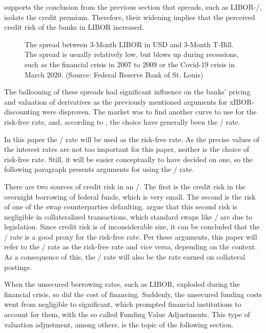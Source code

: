 \documentclass[main.tex]{subfiles}
\begin{document}
     supports the conclusion from the previous section
    that spreads, such as LIBOR-\OIS/, isolate the credit premium.
    Therefore, their widening implies that the perceived credit risk of the banks in LIBOR increased.

    \begin{figure}
        \centering
        \resizebox{\textwidth}{!}{%
            
        }
        \caption{
            The spread between 3-Month LIBOR in USD and 3-Month T-Bill.
            The spread is usually relatively low, 
            but blows up during recessions, 
            such as the financial crisis in 2007 to 2009 or
            the Covid-19 crisis in March 2020.
            (Source: Federal Reserve Bank of St. Louis)
        }
        \label{fig:ted-spread}
    \end{figure}

    The ballooning of these spreads
    had significant influence on the banks' pricing and valuation of derivatives
    as the previously mentioned arguments for xIBOR-discounting were disproven.
    The market was to find another curve to use for the risk-free rate,
    and, according to \textcite{Green2015XVA}, the choice have generally been the \OIS/ rate.

    In this paper the \OIS/ rate will be used as the risk-free rate.
    As the precise values of the interest rates are not too important for this paper,
    neither is the choice of risk-free rate.
    Still, it will be easier conceptually to have decided on one,
    so the following paragraph presents arguments for using the \OIS/ rate.

    There are two sources of credit risk in an \OIS/.
    The first is the credit risk in the overnight borrowing of federal funds, which is very small. 
    The second is the risk of one of the swap counterparties defaulting.
    \textcite{HullWhiteOISvsLIBOR}
    argue that this second risk is negligible in collateralized transactions,
    which standard swaps like \OIS/ are due to legislation.
    Since credit risk is of inconsiderable size, it can be concluded 
    that the \OIS/ rate is a good proxy for the risk-free rate.
    Per these arguments, this paper will refer to the \OIS/ rate as the risk-free rate
    and vice versa, depending on the context.
    As a consequence of this, the \OIS/ rate will also be the rate earned on collateral postings.

    When the unsecured borrowing rates, such as LIBOR, exploded during the financial crisis, 
    so did the cost of financing. 
    Suddenly, the unsecured funding costs went from negligible to significant,
    which prompted financial institutions to account for them, 
    with the so called Funding Value Adjustments. 
    This type of valuation adjustment, among others, is the topic of the following section.
\end{document}
